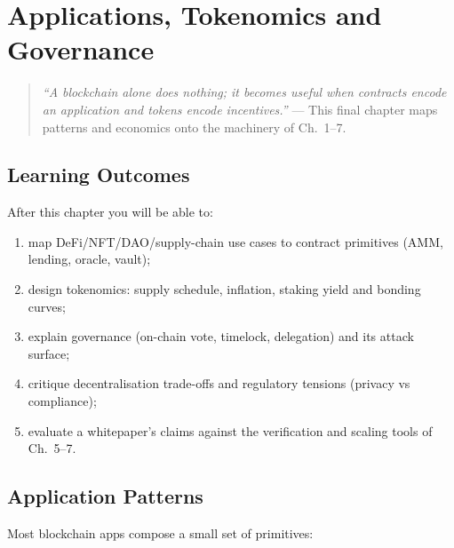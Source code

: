\chapter{Applications, Tokenomics and Governance}\label{ch:applications}

\begin{quote}
\emph{``A blockchain alone does nothing; it becomes useful when contracts encode an application and tokens encode incentives.''} --- This final chapter maps patterns and economics onto the machinery of Ch.~1--7.
\end{quote}

\noindent{}
\vspace{0.4em}

\section*{Learning Outcomes}
After this chapter you will be able to:
\begin{enumerate}[label=(L\arabic*)]
    \item map DeFi/NFT/DAO/supply-chain use cases to contract primitives (AMM, lending, oracle, vault);
    \item design tokenomics: supply schedule, inflation, staking yield and bonding curves;
    \item explain governance (on-chain vote, timelock, delegation) and its attack surface;
    \item critique decentralisation trade-offs and regulatory tensions (privacy vs compliance);
    \item evaluate a whitepaper's claims against the verification and scaling tools of Ch.~5--7.
\end{enumerate}

\section{Application Patterns}\label{sec:patterns}
Most blockchain apps compose a small set of primitives:

